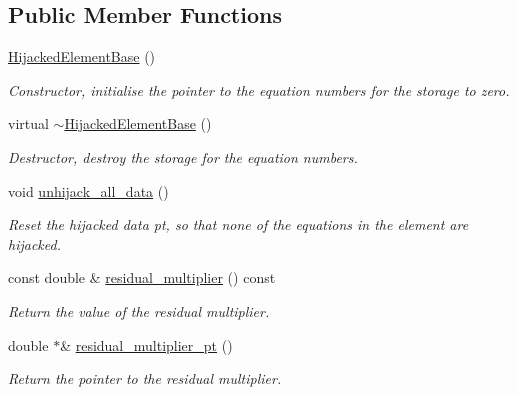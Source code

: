 \subsection*{Public Member Functions}
\begin{DoxyCompactItemize}
\item 
\hyperlink{classoomph_1_1HijackedElementBase_ad062d9c27f6fd3d613a86b32980fa71e}{Hijacked\+Element\+Base} ()
\begin{DoxyCompactList}\small\item\em Constructor, initialise the pointer to the equation numbers for the storage to zero. \end{DoxyCompactList}\item 
virtual \hyperlink{classoomph_1_1HijackedElementBase_af3393a98fc80a2f7761046920b4a3040}{$\sim$\+Hijacked\+Element\+Base} ()
\begin{DoxyCompactList}\small\item\em Destructor, destroy the storage for the equation numbers. \end{DoxyCompactList}\item 
void \hyperlink{classoomph_1_1HijackedElementBase_a0a373a87d121205b9cc0fd54ea41f4ad}{unhijack\+\_\+all\+\_\+data} ()
\begin{DoxyCompactList}\small\item\em Reset the hijacked data pt, so that none of the equations in the element are hijacked. \end{DoxyCompactList}\item 
const double \& \hyperlink{classoomph_1_1HijackedElementBase_a79740641b6ac5b5a966d072bd10ab66a}{residual\+\_\+multiplier} () const
\begin{DoxyCompactList}\small\item\em Return the value of the residual multiplier. \end{DoxyCompactList}\item 
double $\ast$\& \hyperlink{classoomph_1_1HijackedElementBase_affdb1888fb6b2de051bc0345e6f5d934}{residual\+\_\+multiplier\+\_\+pt} ()
\begin{DoxyCompactList}\small\item\em Return the pointer to the residual multiplier. \end{DoxyCompactList}\end{DoxyCompactItemize}
